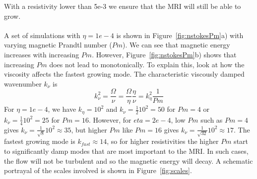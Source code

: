 With a resistivity lower than 5e-3 we ensure that the MRI will still be able to grow.\\
\\
A set of simulations with $\eta=1e-4$ is shown in Figure~\ref{fig:nstokesPm}a) with varying magnetic Prandtl number ($Pm$). We can see that magnetic energy increases with increasing $Pm$. However, Figure~\ref{fig:nstokesPm}b) shows that increasing $Pm$ does not lead to monotonically. To explain this, look at how the viscosity affects the fastest growing mode. The characteristic viscously damped wavenumber $k_\nu$ is
\begin{equation*}
  k_\nu^2=\frac\Omega\nu=\frac\Omega\eta\frac\eta\nu=k_\eta^2\frac1{Pm}
\end{equation*}
For $\eta=1e-4$, we have $k_\eta=10^2$ and $k_\nu=\frac1210^2=50$ for $Pm=4$ or $k_\nu=\frac1410^2=25$ for $Pm=16$. However, for $eta=2e-4$, low $Pm$ such as $Pm=4$ gives $k_\nu=\frac1{\sqrt{8}}10^2\approx35$, but higher $Pm$ like $Pm=16$ gives $k_\nu=\frac1{\sqrt{32}}10^2\approx17$. The fastest growing mode is $k_{fast}\approx 14$, so for higher resistivities the higher $Pm$ start to significantly damp modes that are most important to the MRI. In such cases, the flow will not be turbulent and so the magnetic energy will decay. A schematic portrayal of the scales involved is shown in Figure~\ref{fig:scales}.
%
